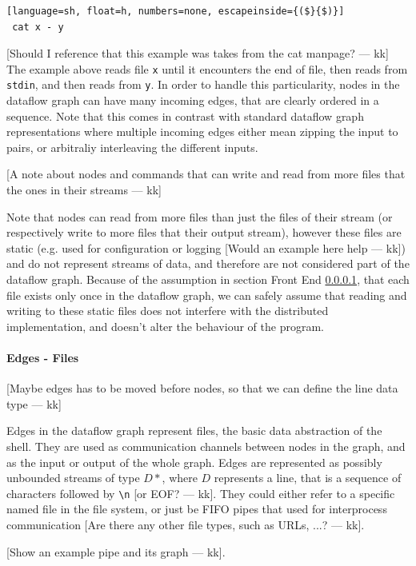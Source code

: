 \documentclass[sigplan,10pt,review,anonymous]{acmart}
\newcommand{\kk}[1]{[{\color{magenta}#1 --- kk}]}
\begin{document}
\begin{lstlisting}[language=sh, float=h, numbers=none, escapeinside={($}{$)}]
 cat x - y
\end{lstlisting}

\kk{Should I reference that this example was takes from the cat
  manpage?} The example above reads file \texttt{x} until it
encounters the end of file, then reads from \texttt{stdin}, and then
reads from \texttt{y}. In order to handle this particularity, nodes in
the dataflow graph can have many incoming edges, that are clearly
ordered in a sequence. Note that this comes in contrast with standard
dataflow graph representations where multiple incoming edges either
mean zipping the input to pairs, or arbitraliy interleaving the
different inputs.


\kk{A note about nodes and commands that can write and read from more
  files that the ones in their streams}

Note that nodes can read from more files than just the files of their
stream (or respectively write to more files that their output stream),
however these files are static (e.g. used for configuration or logging
\kk{Would an example here help}) and do not represent streams of data,
and therefore are not considered part of the dataflow graph. Because
of the assumption in section Front End \ref{}, that each file exists
only once in the dataflow graph, we can safely assume that reading and
writing to these static files does not interfere with the distributed
implementation, and doesn't alter the behaviour of the program.

\paragraph{Edges - Files}

\kk{Maybe edges has to be moved before nodes, so that we can define
  the line data type}

Edges in the dataflow graph represent files, the basic data
abstraction of the shell. They are used as communication channels
between nodes in the graph, and as the input or output of the whole
graph. Edges are represented as possibly unbounded streams of type
$D*$, where $D$ represents a line, that is a sequence of characters
followed by \verb|\n| \kk{or EOF?}. They could either refer to a
specific named file in the file system, or just be FIFO pipes that
used for interprocess communication \kk{Are there any other file
  types, such as URLs, ...?}.

\kk{Show an example pipe and its graph}.
\end{document}
